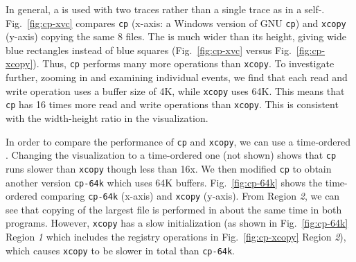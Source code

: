 In general, a \VDP{} is used with two traces rather than a single
trace as in a self-\VDP{}.
Fig.~\ref{fig:cp-xvc} compares {\tt cp} (x-axis: a Windows version
of GNU {\tt cp}) and {\tt xcopy} (y-axis) copying the same 8 files.
The \VDP{} is much wider than its height, giving
wide blue rectangles instead of blue squares 
(Fig.~\ref{fig:cp-xvc} versus Fig.~\ref{fig:cp-xcopy}).
Thus, {\tt cp} performs many more operations than {\tt xcopy}.
To investigate further, zooming in and examining individual events, 
we find that each read and write operation uses a buffer size of 4K,
while {\tt xcopy} uses 64K.
This means that {\tt cp} has 16 times more read and write operations
than {\tt xcopy}.
This is consistent with the width-height ratio in the visualization.


In order to compare the performance of {\tt cp} and {\tt xcopy},
we can use a time-ordered \VDP{}.
Changing the visualization to a time-ordered one (not shown)
shows that {\tt cp} runs slower than {\tt xcopy} though less than 16x.
We then modified {\tt cp} to obtain another version
{\tt cp-64k} which uses 64K buffers.
Fig.~\ref{fig:cp-64k} shows the time-ordered \VDP{} comparing
{\tt cp-64k} (x-axis) and {\tt xcopy} (y-axis).
From Region {\em 2}, we can see that copying of the largest file
is performed in about the same time in both programs.
However, {\tt xcopy} has a slow initialization 
(as shown in Fig.~\ref{fig:cp-64k} Region {\em 1} which includes the registry
operations in Fig.~\ref{fig:cp-xcopy} Region {\em 2}),
which causes {\tt xcopy} to be slower in total than {\tt cp-64k}.



